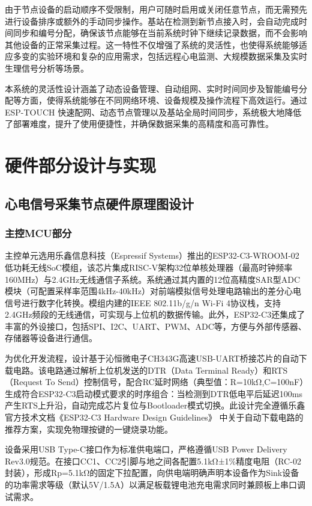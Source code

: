 由于节点设备的启动顺序不受限制，用户可随时启用或关闭任意节点，而无需预先进行设备排序或额外的手动同步操作。基站在检测到新节点接入时，会自动完成时间同步和编号分配，确保该节点能够在当前系统时钟下继续记录数据，而不会影响其他设备的正常采集过程。这一特性不仅增强了系统的灵活性，也使得系统能够适应多变的实验环境和复杂的应用需求，包括远程心电监测、大规模数据采集及实时生理信号分析等场景。

本系统的灵活性设计涵盖了动态设备管理、自动组网、实时时间同步及智能编号分配等方面，使得系统能够在不同网络环境、设备规模及操作流程下高效运行。通过ESP-TOUCH 快速配网、动态节点管理以及基站全局时间同步，系统极大地降低了部署难度，提升了使用便捷性，并确保数据采集的高精度和高可靠性。

\newpage    %

\section{硬件部分设计与实现}

\subsection{心电信号采集节点硬件原理图设计}

\subsubsection{主控MCU部分}

主控单元选用乐鑫信息科技（Espressif Systems）推出的ESP32-C3-WROOM-02低功耗无线SoC模组，该芯片集成RISC-V架构32位单核处理器（最高时钟频率160MHz）与2.4GHz无线通信子系统。系统通过其内置的12位高精度SAR型ADC模块（可配置采样率范围4kHz-40kHz）对前端模拟信号处理电路输出的差分心电信号进行数字化转换。模组内建的IEEE 802.11b/g/n Wi-Fi 4协议栈，支持2.4GHz频段的无线通信，可实现与上位机的数据传输。此外，ESP32-C3还集成了丰富的外设接口，包括SPI、I2C、UART、PWM、ADC等，方便与外部传感器、存储器等设备进行通信。

为优化开发流程，设计基于沁恒微电子CH343G高速USB-UART桥接芯片的自动下载电路。该电路通过解析上位机发送的DTR（Data Terminal Ready）和RTS（Request To Send）控制信号，配合RC延时网络（典型值：R=10kΩ,C=100nF）生成符合ESP32-C3启动模式要求的时序组合：当检测到DTR低电平后延迟100ms产生RTS上升沿，自动完成芯片复位与Bootloader模式切换。此设计完全遵循乐鑫官方技术文档《ESP32-C3 Hardware Design Guidelines》\cite{espressif2021esp32c3} 中关于自动下载电路的推荐方案，实现免物理按键的一键烧录功能。

设备采用USB Type-C接口作为标准供电端口，严格遵循USB Power Delivery Rev3.0规范。在接口CC1、CC2引脚与地之间各配置5.1kΩ±1$\%$精度电阻（RC-02封装），形成Rp=5.1kΩ的固定下拉配置，向供电端明确声明本设备作为Sink设备的功率需求等级（默认5V/1.5A）以满足板载锂电池充电需求同时兼顾板上串口调试需求。


